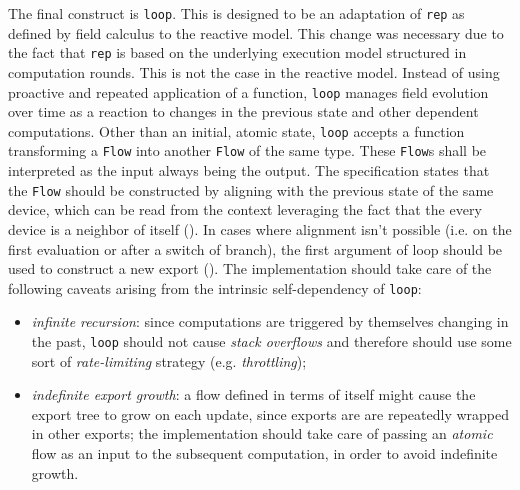 The final construct is \texttt{loop}.
%
This is designed to be an adaptation of \texttt{rep} as defined by field calculus to the reactive model.
%
This change was necessary due to the fact that \texttt{rep} is based on the underlying execution model structured in computation rounds.
%
This is not the case in the reactive model.
%
Instead of using proactive and repeated application of a function, \texttt{loop} manages field evolution over time as a reaction to changes in the previous state and other dependent computations.
%
Other than an initial, atomic state, \texttt{loop} accepts a function transforming a \texttt{Flow} into another \texttt{Flow} of the same type.
%
These \texttt{Flow}s shall be interpreted as the input always being  the output.
%
The specification states that the  \texttt{Flow} should be constructed by aligning with the previous state of the same device, which can be read from the context leveraging the fact that the every device is a neighbor of itself ().
%
In cases where alignment isn't possible (i.e. on the first evaluation or after a switch of branch), the first argument of loop should be used to construct a new export ().
%
The implementation should take care of the following caveats arising from the intrinsic self-dependency of \texttt{loop}:
%
\begin{itemize}
    \item \textit{infinite recursion}: since computations are triggered by themselves changing in the past, \texttt{loop} should not cause \textit{stack overflows} and therefore should use some sort of \textit{rate-limiting} strategy (e.g. \textit{throttling});
    \item \textit{indefinite export growth}: a flow defined in terms of itself might cause the export tree to grow on each update, since exports are are repeatedly wrapped in other exports; the implementation should take care of passing an \textit{atomic} flow as an input to the subsequent computation, in order to avoid indefinite growth.
\end{itemize}
%
